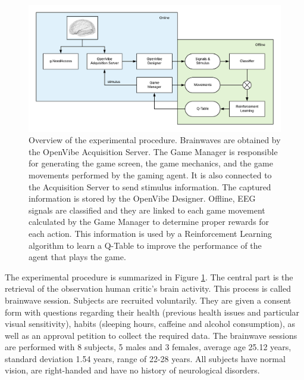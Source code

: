 \documentclass[journal]{IEEEtran}
\begin{document}
\begin{figure}
    \centering
    \includegraphics[width=\textwidth]{Images/complete_flow.png}
    \caption{Overview of the experimental procedure. Brainwaves are obtained by the OpenVibe Acquisition Server.  The Game Manager is responsible for generating the game screen, the game mechanics, and the game movements performed by the gaming agent.  It is also connected to the Acquisition Server to send stimulus information.  The captured information is stored by the OpenVibe Designer.  Offline, EEG signals are classified and they are linked to each game movement calculated by the Game Manager to determine proper rewards for each action.  This information is used by a Reinforcement Learning algorithm to learn a Q-Table to improve the performance of the agent that plays the game.}
    \label{diag:complete_flow}
\end{figure}

The experimental procedure is summarized in Figure \ref{diag:complete_flow}. The central part is the retrieval of the observation human critic's brain activity.  This process is called brainwave session. Subjects are recruited voluntarily. They are given a consent form with questions regarding their health (previous health issues and particular visual sensitivity), habits (sleeping hours, caffeine and alcohol consumption), as well as an approval petition to collect the required data. The brainwave sessions are performed with 8 subjects, 5 males and 3 females, average age 25.12 years, standard deviation 1.54 years, range of 22-28 years. All subjects have normal vision, are right-handed and have no history of neurological disorders.
\end{document}
